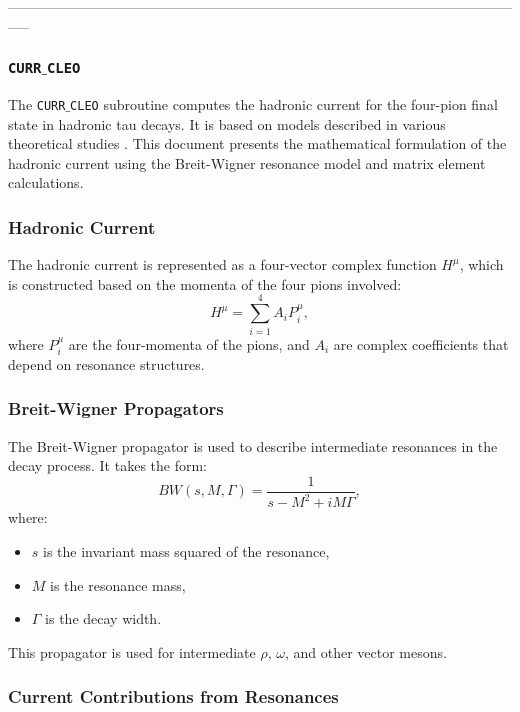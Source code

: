 \documentclass[12pt]{article}
\begin{document}
-----------------------------------------------------------------------------------------------------------------\\

\subsubsection{\texttt{CURR$\_$CLEO}}

The \texttt{CURR$\_$CLEO} subroutine computes the hadronic current for the four-pion final state in hadronic tau decays. It is based on models described in various theoretical studies \cite{fischer1980, decker1987, gellmann1962}. This document presents the mathematical formulation of the hadronic current using the Breit-Wigner resonance model and matrix element calculations.

\subsubsection{Hadronic Current}

The hadronic current is represented as a four-vector complex function $H^{\mu}$, which is constructed based on the momenta of the four pions involved:
\begin{equation}
H^{\mu} = \sum_{i=1}^{4} A_i P_i^{\mu},
\end{equation}
where $P_i^{\mu}$ are the four-momenta of the pions, and $A_i$ are complex coefficients that depend on resonance structures.

\subsubsection{Breit-Wigner Propagators}

The Breit-Wigner propagator is used to describe intermediate resonances in the decay process. It takes the form:
\begin{equation}
BW(s, M, \Gamma) = \frac{1}{s - M^2 + i M \Gamma},
\end{equation}
where:
\begin{itemize}
\item $s$ is the invariant mass squared of the resonance,
\item $M$ is the resonance mass,
\item $\Gamma$ is the decay width.
\end{itemize}
This propagator is used for intermediate $\rho$, $\omega$, and other vector mesons.

\subsubsection{Current Contributions from Resonances}
\end{document}
